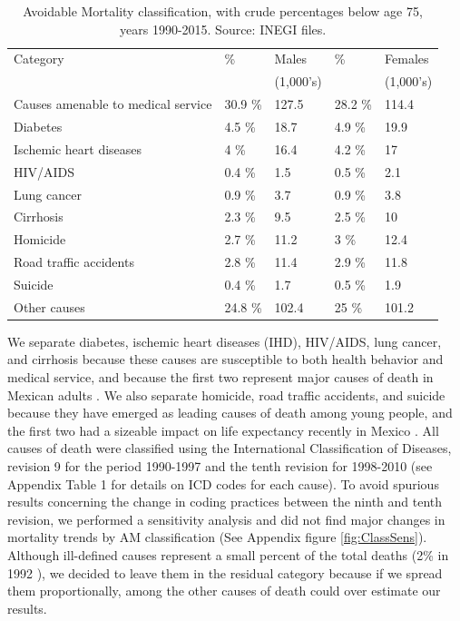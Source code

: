 \documentclass[11.5pt]{article}
\begin{document}
\begin{spacing}{1.5}
\begin{table}[ht]
\centering
\caption{Avoidable Mortality classification, 
             with crude percentages below age 75, years 1990-2015. Source: INEGI files.} 
\label{tab:causes}
\begin{tabular}{lllll}
  \hline
Category &\% & Males &  \% & Females \\ 
 && (1,000's) & & (1,000's)\\ 
  \hline
Causes amenable to medical service & 30.9 \% & 127.5 & 28.2 \% & 114.4 \\ 
  Diabetes & 4.5 \% & 18.7 & 4.9 \% & 19.9 \\ 
  Ischemic heart diseases & 4 \% & 16.4 & 4.2 \% & 17 \\ 
  HIV/AIDS & 0.4 \% & 1.5 & 0.5 \% & 2.1 \\ 
  Lung cancer & 0.9 \% & 3.7 & 0.9 \% & 3.8 \\ 
  Cirrhosis & 2.3 \% & 9.5 & 2.5 \% & 10 \\ 
  Homicide & 2.7 \% & 11.2 & 3 \% & 12.4 \\ 
  Road traffic accidents & 2.8 \% & 11.4 & 2.9 \% & 11.8 \\ 
  Suicide & 0.4 \% & 1.7 & 0.5 \% & 1.9 \\ 
  Other causes & 24.8 \% & 102.4 & 25 \% & 101.2 \\ 
   \hline
\end{tabular}
\end{table}

We separate diabetes, ischemic heart diseases (IHD), HIV/AIDS, lung
cancer, and cirrhosis because these causes are susceptible to both health behavior
and medical service, and because the first two represent major causes of death
in Mexican adults \citep{canudas2014}. We also separate
homicide, road traffic accidents, and suicide because they have emerged as
leading causes of death among young people, and the first two had a sizeable
impact on life expectancy recently in Mexico \citep{canudas2014}. All causes of death were classified using the International Classification of Diseases, revision 9 for the period 1990-1997 and the tenth revision for 1998-2010 (see Appendix Table 1 for details on ICD codes for each cause). To avoid spurious results concerning the change in coding practices between the ninth and tenth revision, we performed a sensitivity analysis and did not find major changes in mortality trends by AM classification (See Appendix figure \ref{fig:ClassSens}). Although ill-defined causes represent a small percent of the total deaths (2\% in 1992 \citep{rivera2002epidemiological}), we decided to leave them in the residual category because if we spread them proportionally,  among the other causes of death could over estimate our results.


\end{spacing}
\end{document}
